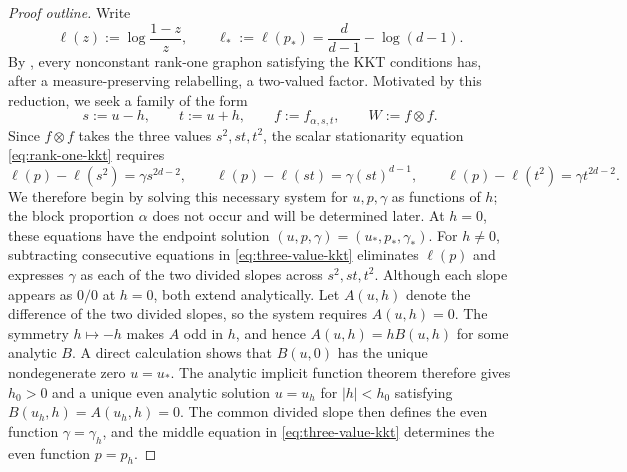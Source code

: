 \begin{proof}[Proof outline]
Write
\[
  \ell(z):=\log\frac{1-z}{z},
  \qquad
  \ell_*:=\ell(p_*)=\frac{d}{d-1}-\log(d-1).
\]
By , every nonconstant rank-one graphon
satisfying the KKT conditions has, after a measure-preserving relabelling, a
two-valued factor.  Motivated by this reduction, we seek a family of the form
\[
  s:=u-h,
  \qquad
  t:=u+h,
  \qquad
  f:=f_{\alpha,s,t},
  \qquad
  W:=f\otimes f.
\]
Since $f\otimes f$ takes the three values $s^2,st,t^2$, the scalar
stationarity equation \eqref{eq:rank-one-kkt} requires
\begin{equation}\label{eq:three-value-kkt}
  \ell(p)-\ell(s^2)=\gamma s^{2d-2},\qquad
  \ell(p)-\ell(st)=\gamma(st)^{d-1},\qquad
  \ell(p)-\ell(t^2)=\gamma t^{2d-2}.
\end{equation}
We therefore begin by solving this necessary system for $u,p,\gamma$ as
functions of $h$; the block proportion $\alpha$ does not occur and will be
determined later.
At $h=0$, these equations have the endpoint solution $(u,p,\gamma)=(u_*,p_*,\gamma_*)$.
For $h\ne0$, subtracting consecutive equations in \eqref{eq:three-value-kkt} eliminates
$\ell(p)$ and expresses $\gamma$ as each of the two divided slopes across
$s^2,st,t^2$.  Although each slope appears as $0/0$ at $h=0$, both extend
analytically.  Let $A(u,h)$ denote the difference of the two divided slopes,
so the system requires $A(u,h)=0$.  The symmetry $h\mapsto-h$ makes $A$ odd in $h$,
and hence $A(u,h)=hB(u,h)$ for some analytic $B$.  A direct calculation shows that
$B(u,0)$ has the unique nondegenerate zero $u=u_*$.  The analytic implicit
function theorem therefore gives $h_0>0$ and a unique even analytic solution
$u=u_h$ for $|h|<h_0$ satisfying $B(u_h,h)=A(u_h,h)=0$.  The common divided slope then defines the even function
$\gamma=\gamma_h$, and the middle equation in
\eqref{eq:three-value-kkt} determines the even function $p=p_h$.


\end{proof}
